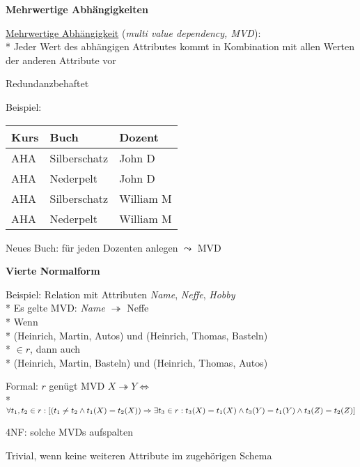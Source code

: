 \textbf{Mehrwertige Abhängigkeiten}
\begin{items}
	\item \underline{Mehrwertige Abhängigkeit} (\emph{multi value dependency, MVD}): \\*
		Jeder Wert des abhängigen Attributes kommt in Kombination mit allen Werten der anderen Attribute vor
	\item Redundanzbehaftet
	\item Beispiel:
	\begin{center}
		\begin{tabular}{|lll|}
		  \hline
		  \textbf{Kurs} & \textbf{Buch} & \textbf{Dozent} \\
		  \hline
		  AHA & Silberschatz & John D \\
		  AHA & Nederpelt & John D \\
		  AHA & Silberschatz & William M \\
		  AHA & Nederpelt & William M \\
		  \hline
		\end{tabular}
	\end{center}
	Neues Buch: für jeden Dozenten anlegen \( \leadsto \) MVD
\end{items}

\textbf{Vierte Normalform}
\begin{items}
	\item Beispiel: Relation mit Attributen \emph{Name}, \emph{Neffe}, \emph{Hobby} \\*
		Es gelte MVD: \emph{Name} \( \twoheadrightarrow \) Neffe \\*
		Wenn \\*
		(Heinrich, Martin, Autos) und (Heinrich, Thomas, Basteln) \\*
		\( \in r \), dann auch \\*
		(Heinrich, Martin, Basteln) und (Heinrich, Thomas, Autos)
	\item Formal: \( r \) genügt MVD \( X \twoheadrightarrow Y \Leftrightarrow \) \\*
		\( \forall t_1, t_2 \in r: [(t_1 \neq t_2 \wedge t_1(X) = t_2(X)) \\* \Rightarrow \exists t_3 \in r: t_3(X)=t_1(X) \wedge t_3(Y)=t_1(Y) \wedge t_3(Z) = t_2(Z) ] \) 
	\item 4NF: solche MVDs aufspalten
	\item Trivial, wenn keine weiteren Attribute im zugehörigen Schema
\end{items}

